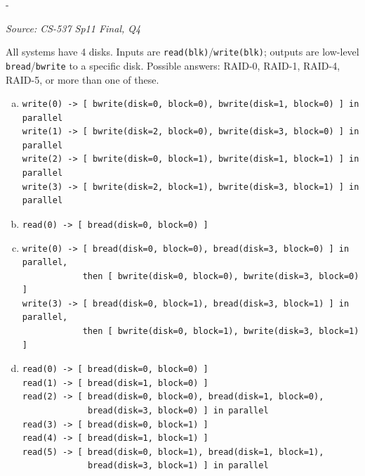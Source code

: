 \documentclass[11pt,a4paper]{article}
\makeatletter
\newcommand{\keepspace}[1]{\par\penalty-100\begingroup
  \setlength{\dimen@}{#1}\dimen@ii\pagegoal\advance\dimen@ii-\pagetotal
  \ifdim\dimen@>\dimen@ii\ifdim\dimen@ii>\z@\vfil\fi\break\fi\endgroup}
\newcounter{qn}[section]
\newenvironment{Qn}[4]{%
  \refstepcounter{qn}\keepspace{7\baselineskip}%
  \begin{tcolorbox}[qboxstyle, title={Q\thesection.\theqn\ \ [#1 \textbar\ #2]\ \ #4}]%
  {\footnotesize\color{g3}\textit{Source: #3}}\par\smallskip%
}{%
  \end{tcolorbox}%
}
\makeatother
\begin{document}
\begin{Qn}{Hard}{Lect 22A}{CS-537 Sp11 Final, Q4}{Unveiling the RAID box from bread/bwrite traces}
All systems have 4 disks. Inputs are \texttt{read(blk)}/\texttt{write(blk)};
outputs are low-level \texttt{bread}/\texttt{bwrite} to a specific disk.
Possible answers: RAID-0, RAID-1, RAID-4, RAID-5, or more than one of
these.
\begin{enumerate}[(a)]
\item
\begin{lstlisting}[numbers=none]
write(0) -> [ bwrite(disk=0, block=0), bwrite(disk=1, block=0) ] in parallel
write(1) -> [ bwrite(disk=2, block=0), bwrite(disk=3, block=0) ] in parallel
write(2) -> [ bwrite(disk=0, block=1), bwrite(disk=1, block=1) ] in parallel
write(3) -> [ bwrite(disk=2, block=1), bwrite(disk=3, block=1) ] in parallel
\end{lstlisting}
\item \texttt{read(0) -> [ bread(disk=0, block=0) ]}
\item
\begin{lstlisting}[numbers=none]
write(0) -> [ bread(disk=0, block=0), bread(disk=3, block=0) ] in parallel,
            then [ bwrite(disk=0, block=0), bwrite(disk=3, block=0) ]
write(3) -> [ bread(disk=0, block=1), bread(disk=3, block=1) ] in parallel,
            then [ bwrite(disk=0, block=1), bwrite(disk=3, block=1) ]
\end{lstlisting}
\item
\begin{lstlisting}[numbers=none]
read(0) -> [ bread(disk=0, block=0) ]
read(1) -> [ bread(disk=1, block=0) ]
read(2) -> [ bread(disk=0, block=0), bread(disk=1, block=0),
             bread(disk=3, block=0) ] in parallel
read(3) -> [ bread(disk=0, block=1) ]
read(4) -> [ bread(disk=1, block=1) ]
read(5) -> [ bread(disk=0, block=1), bread(disk=1, block=1),
             bread(disk=3, block=1) ] in parallel
\end{lstlisting}
\end{enumerate}
\end{Qn}
\end{document}
